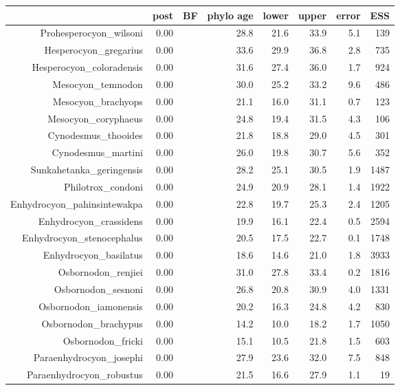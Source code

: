 \begin{table}[ht]
\centering
\begin{tabular}{rrrrrrrr}
  \hline
 & post & BF & phylo age & lower & upper & error & ESS \\ 
  \hline
Prohesperocyon\_wilsoni & 0.00 &  & 28.8 & 21.6 & 33.9 & 5.1 & 139 \\ 
  Hesperocyon\_gregarius & 0.00 &  & 33.6 & 29.9 & 36.8 & 2.8 & 735 \\ 
  Hesperocyon\_coloradensis & 0.00 &  & 31.6 & 27.4 & 36.0 & 1.7 & 924 \\ 
  Mesocyon\_temnodon & 0.00 &  & 30.0 & 25.2 & 33.2 & 9.6 & 486 \\ 
  Mesocyon\_brachyops & 0.00 &  & 21.1 & 16.0 & 31.1 & 0.7 & 123 \\ 
  Mesocyon\_coryphaeus & 0.00 &  & 24.8 & 19.4 & 31.5 & 4.3 & 106 \\ 
  Cynodesmus\_thooides & 0.00 &  & 21.8 & 18.8 & 29.0 & 4.5 & 301 \\ 
  Cynodesmus\_martini & 0.00 &  & 26.0 & 19.8 & 30.7 & 5.6 & 352 \\ 
  Sunkahetanka\_geringensis & 0.00 &  & 28.2 & 25.1 & 30.5 & 1.9 & 1487 \\ 
  Philotrox\_condoni & 0.00 &  & 24.9 & 20.9 & 28.1 & 1.4 & 1922 \\ 
  Enhydrocyon\_pahinsintewakpa & 0.00 &  & 22.8 & 19.7 & 25.3 & 2.4 & 1205 \\ 
  Enhydrocyon\_crassidens & 0.00 &  & 19.9 & 16.1 & 22.4 & 0.5 & 2594 \\ 
  Enhydrocyon\_stenocephalus & 0.00 &  & 20.5 & 17.5 & 22.7 & 0.1 & 1748 \\ 
  Enhydrocyon\_basilatus & 0.00 &  & 18.6 & 14.6 & 21.0 & 1.8 & 3933 \\ 
  Osbornodon\_renjiei & 0.00 &  & 31.0 & 27.8 & 33.4 & 0.2 & 1816 \\ 
  Osbornodon\_sesnoni & 0.00 &  & 26.8 & 20.8 & 30.9 & 4.0 & 1331 \\ 
  Osbornodon\_iamonensis & 0.00 &  & 20.2 & 16.3 & 24.8 & 4.2 & 830 \\ 
  Osbornodon\_brachypus & 0.00 &  & 14.2 & 10.0 & 18.2 & 1.7 & 1050 \\ 
  Osbornodon\_fricki & 0.00 &  & 15.1 & 10.5 & 21.8 & 1.5 & 603 \\ 
  Paraenhydrocyon\_josephi & 0.00 &  & 27.9 & 23.6 & 32.0 & 7.5 & 848 \\ 
  Paraenhydrocyon\_robustus & 0.00 &  & 21.5 & 16.6 & 27.9 & 1.1 & 19 \\ 

\end{tabular}
\end{table}
